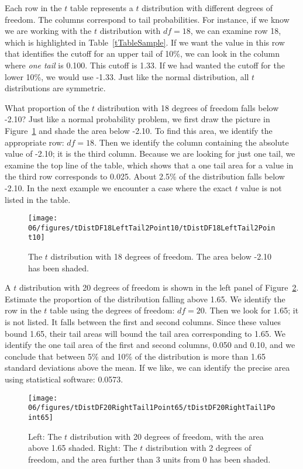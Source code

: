 Each row in the $t$ table represents a $t$ distribution with different degrees of freedom. The columns correspond to tail probabilities. For instance, if we know we are working with the $t$ distribution with $df=18$, we can examine row 18, which is highlighted in Table~\ref{tTableSample}. If we want the value in this row that identifies the cutoff for an upper tail of 10\%, we can look in the column where \emph{one tail} is 0.100. This cutoff is 1.33. If we had wanted the cutoff for the lower 10\%, we would use -1.33. Just like the normal distribution, all $t$ distributions are symmetric.

\begin{example}{What proportion of the $t$ distribution with 18 degrees of freedom falls below -2.10?}
Just like a normal probability problem, we first draw the picture in Figure~\ref{tDistDF18LeftTail2Point10} and shade the area below -2.10. To find this area, we identify the appropriate row: $df=18$. Then we identify the column containing the absolute value of -2.10; it is the third column. Because we are looking for just one tail, we examine the top line of the table, which shows that a one tail area for a value in the third row corresponds to 0.025. About 2.5\% of the distribution falls below -2.10. In the next example we encounter a case where the exact $t$ value is not listed in the table.
\end{example}
\begin{figure}
\centering
\texttt{[image: 06/figures/tDistDF18LeftTail2Point10/tDistDF18LeftTail2Point10]}
\caption{The $t$ distribution with 18 degrees of freedom. The area below -2.10 has been shaded.}
\label{tDistDF18LeftTail2Point10}
\end{figure}

\begin{example}{A $t$ distribution with 20 degrees of freedom is shown in the left panel of Figure~\ref{tDistDF20RightTail1Point65}. Estimate the proportion of the distribution falling above 1.65.}
We identify the row in the $t$ table using the degrees of freedom: $df=20$. Then we look for 1.65; it is not listed. It falls between the first and second columns. Since these values bound 1.65, their tail areas will bound the tail area corresponding to 1.65. We identify the one tail area of the first and second columns, 0.050 and 0.10, and we conclude that between 5\% and 10\% of the distribution is more than 1.65 standard deviations above the mean. If we like, we can identify the precise area using statistical software: 0.0573.
\end{example}
\begin{figure}
\centering
\texttt{[image: 06/figures/tDistDF20RightTail1Point65/tDistDF20RightTail1Point65]}
\caption{Left: The $t$ distribution with 20 degrees of freedom, with the area above 1.65 shaded. Right: The $t$ distribution with 2 degrees of freedom, and the area further than 3 units from 0 has been shaded.}
\label{tDistDF20RightTail1Point65}
\end{figure}

